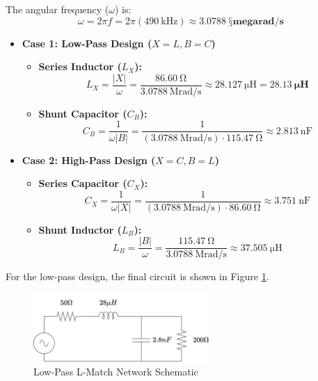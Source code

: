 The angular frequency ($\omega$) is:
\begin{equation}
    \omega = 2 \pi f = 2 \pi (\SI{490}{\kilo\hertz}) \approx \mathbf{\SI{3.0788}{§mega\radian\per\second}}
\end{equation}

\begin{itemize}
    \item \textbf{Case 1: Low-Pass Design ($X = L, B = C$)}
    \begin{itemize}
        \item \textbf{Series Inductor ($L_X$):} 
        \begin{equation}
            L_X = \frac{|X|}{\omega} = \frac{\SI{86.60}{\ohm}}{\SI{3.0788}{\mega\radian\per\second}} \approx \SI{28.127}{\micro\henry} = \mathbf{\SI{28.13}{\micro\henry}}
        \end{equation}
        \item \textbf{Shunt Capacitor ($C_B$):} 
        \begin{equation}
            C_B = \frac{1}{\omega |B|} = \frac{1}{(\SI{3.0788}{\mega\radian\per\second}) \cdot \SI{115.47}{\ohm}} \approx \SI{2.813}{\nano\farad}
        \end{equation}
    \end{itemize}

    \item \textbf{Case 2: High-Pass Design ($X = C, B = L$)}
    \begin{itemize}
        \item \textbf{Series Capacitor ($C_X$):} 
        \begin{equation}
            C_X = \frac{1}{\omega |X|} = \frac{1}{(\SI{3.0788}{\mega\radian\per\second}) \cdot \SI{86.60}{\ohm}} \approx \SI{3.751}{\nano\farad}
        \end{equation}
        \item \textbf{Shunt Inductor ($L_B$):} 
        \begin{equation}
            L_B = \frac{|B|}{\omega} = \frac{\SI{115.47}{\ohm}}{\SI{3.0788}{\mega\radian\per\second}} \approx \SI{37.505}{\micro\henry}
        \end{equation}
    \end{itemize}
\end{itemize}

For the low-pass design, the final circuit is shown in Figure \ref{fig:lmatch_lp}.

\begin{figure}[H]
    \centering
    \includegraphics[width=0.6\textwidth]{Images/LC-values.png}
    \caption{Low-Pass L-Match Network Schematic}
    \label{fig:lmatch_lp}
\end{figure}

